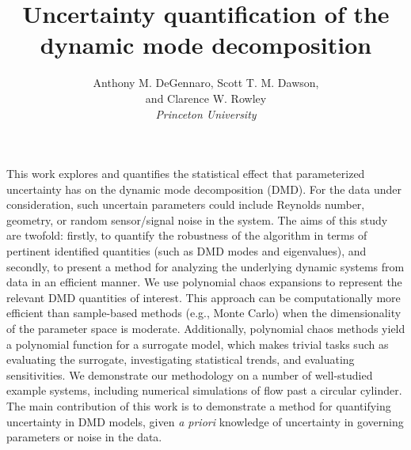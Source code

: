 \documentclass[12pt]{article}
\title{Uncertainty quantification of the dynamic mode decomposition}
\author{%
  Anthony M. DeGennaro, 
  Scott T. M. Dawson, \\ and
  Clarence W. Rowley\\
  \itshape
   Princeton University\\
 }
\begin{document}
\maketitle

 This work explores and quantifies the statistical effect that
 parameterized uncertainty has on the dynamic mode decomposition
 (DMD).  For the data under consideration, such uncertain parameters
 could include Reynolds number, geometry, or random {\color{green}
   sensor/signal} noise in the system.  The aims of this study are
 twofold: firstly, to quantify the robustness of the algorithm in
 terms of pertinent identified quantities (such as DMD modes and
 eigenvalues), and secondly, to present a method for analyzing the
 underlying dynamic systems from data in an efficient
 manner. {\color{green} We use polynomial chaos expansions to
   represent the relevant DMD quantities of interest. This approach}
 can be computationally more efficient than sample-based methods
 (e.g., Monte Carlo) when the dimensionality of the parameter space is
 moderate. Additionally, polynomial chaos methods yield a polynomial
 function for a surrogate model, which makes trivial tasks such as
 evaluating the surrogate, investigating statistical trends, and
 evaluating sensitivities.  We demonstrate our methodology on a number
 of well-studied example systems, including numerical simulations of
 flow past a circular cylinder. {\color{green} The main contribution
   of this work is to demonstrate a method for quantifying uncertainty
   in DMD models, given {\it a priori} knowledge of uncertainty in
   governing parameters or noise in the data.}

\end{document}
